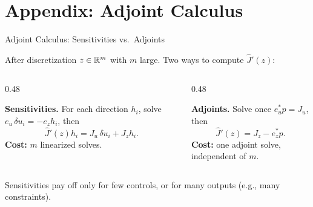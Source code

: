 \documentclass[main.tex]{subfiles}
\begin{document}
\section{Appendix: Adjoint Calculus}

\begin{frame}[label=adjoints]{Adjoint Calculus: Sensitivities vs.\ Adjoints}
  \begin{hlbox}
    After discretization $z \in \mathbb{R}^m$ with $m$ large. Two ways to compute $\hat J'(z)$:
  \end{hlbox}

  \begin{columns}[T]
    \begin{column}{0.48\textwidth}
      \begin{hlbox}
        \textbf{Sensitivities.} For each direction $h_i$, solve $e_u\,\delta u_i = -e_z h_i$, then
        \[
          \hat J'(z)h_i = J_u\,\delta u_i + J_z h_i .
        \]
        \textbf{Cost:} $m$ linearized solves.
      \end{hlbox}
    \end{column}
    \begin{column}{0.48\textwidth}
      \begin{hlbox}
        \textbf{Adjoints.} Solve once $e_u^* p = J_u$, then
        \[
          \hat J'(z) = J_z - e_z^* p .
        \]
        \textbf{Cost:} one adjoint solve, independent of $m$.
      \end{hlbox}
    \end{column}
  \end{columns}

  \begin{qbox}
    Sensitivities pay off only for few controls, or for many outputs (e.g., many constraints).
  \end{qbox}
  \vfill\hfill\hyperlink{hessian<3>}{}
\end{frame}
\end{document}
